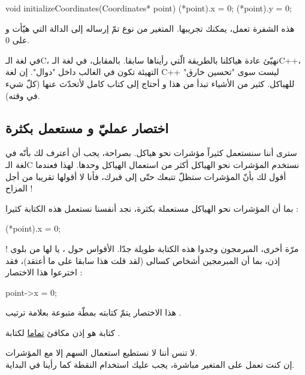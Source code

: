 \begin{Csource}
void initializeCoordinates(Coordinates* point)
{
	(*point).x = 0;
	(*point).y = 0;
}
\end{Csource}

هذه الشفرة تعمل، يمكنك تجريبها. المتغير من نوع
تمّ إرساله إلى الدالة التي هيّأت
و
على 0.

\begin{information}
في لغة الـ\textenglish{C}،
نهيّئ عادة هياكلنا بالطريقة الّتي رأيناها سابقا. بالمقابل، في لغة الـ\textenglish{C++}،
التهيئة تكون في الغالب داخل "دوال".
إن لغة
\textenglish{C++}
ليست سوى "تحسين خارق" للهياكل. كثير من الأشياء تبدأ من هذا و أحتاج إلى كتاب كامل لأتحدّث عنها (كلّ شيء في وقته).
\end{information}

\subsection{اختصار عمليّ و مستعمل بكثرة}

سترى أننا سنستعمل كثيراً مؤشرات نحو هياكل. بصراحة، يجب أن أعترف لك بأنّه
في لغة الـ\textenglish{C}
نستخدم  المؤشرات نحو الهياكل أكثر من استعمال الهياكل وحدها. لهذا فعندما أقول لك بأنّ المؤشرات ستظلّ تتبعك حتّى إلى قبرك، فأنا لا أقولها تقريبا من أجل المزاح !

بما أن المؤشرات نحو الهياكل مستعملة بكثرة، نجد أنفسنا نستعمل هذه الكتابة كثيرا :
\begin{Csource}
(*point).x = 0;
\end{Csource}

مرّة أخرى، المبرمجون وجدوا هذه الكتابة طويلة جدّا. الأقواس حول
،
يا لها من بلوى ! إذن، بما أن المبرمجين أشخاص كسالى (لقد قلت هذا سابقا على ما أعتقد)، فقد اخترعوا هذا الاختصار :

\begin{Csource}
point->x = 0;
\end{Csource}

هذا الاختصار يتمّ كتابته بمطّة
\InlineCode{-}
متبوعة بعلامة ترتيب
\InlineCode{>}.

كتابة
هو إذن مكافئ
\underline{تماما}
لكتابة
.

\begin{warning}
  لا تنس أننا لا نستطيع استعمال السهم إلا مع المؤشرات.\\
إن كنت تعمل على المتغير مباشرة، يجب عليك استخدام النقطة كما رأينا في البداية.
\end{warning}

